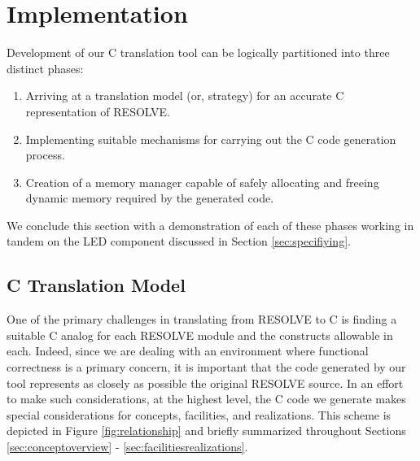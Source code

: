 \section{Implementation}\label{sec:impl}
Development of our C translation tool can be logically partitioned into three distinct phases: 
\begin{enumerate}
\item Arriving at a translation model (or, strategy) for an accurate C representation of RESOLVE.
\item Implementing suitable mechanisms for carrying out the C code generation process.
\item Creation of a memory manager capable of safely allocating and freeing dynamic memory required by the generated code.
\end{enumerate}
We conclude this section with a demonstration of each of these phases working in tandem on the LED component discussed in Section \ref{sec:specifiying}. 

\subsection{C Translation Model}
One of the primary challenges in translating from RESOLVE to C is finding a suitable C analog for each RESOLVE module and the constructs allowable in each. Indeed, since we are dealing with an environment where functional correctness is a primary concern, it is important that the code generated by our tool represents as closely as possible the original RESOLVE source. In an effort to make such considerations, at the highest level, the C code we generate makes special considerations for concepts, facilities, and realizations. This scheme is depicted in Figure \ref{fig:relationship} and briefly summarized throughout Sections \ref{sec:conceptoverview} - \ref{sec:facilitiesrealizations}.

